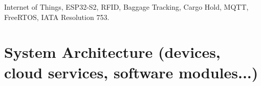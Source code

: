 \documentclass[conference]{IEEEtran}
\begin{document}
\begin{IEEEkeywords}
Internet of Things, ESP32-S2, RFID, Baggage Tracking, Cargo Hold, MQTT, FreeRTOS, IATA Resolution 753.
\end{IEEEkeywords}

\section{System Architecture (devices, cloud services, software modules...)}
%
%
%
%

\end{document}
